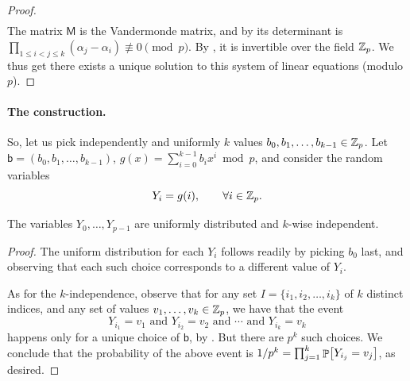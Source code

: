 \begin{proof}
\begin{align*}
    \end{align*}
    The matrix $\mathsf{M}$ is the Vandermonde matrix, and by
     its determinant is $\prod_{1 \leq i < j \leq k} (\alpha_j - \alpha_i) \not\equiv 0 \pmod p$.
    By , it is invertible over the field $\mathbb{Z}_p$.
    We thus get there exists a unique solution to this system of linear equations
    (modulo $p$).
\end{proof}





\paragraph*{The construction.}

So, let us pick independently and uniformly $k$ values
$b_0, b_1, \ldots, b_{k-1} \in \mathbb{Z}_p$. Let
$\mathsf{b} = (b_0, b_1,\ldots, b_{k-1})$,
$g(x) = \sum_{i=0}^{k-1} b_i x^i \bmod p$, and consider the random
variables
\begin{equation*}
    Y_i = g(i), \qquad\forall i \in \mathbb{Z}_p.
\end{equation*}

\begin{lemma}
    The variables $Y_0, \ldots,Y_{p-1}$ are uniformly distributed and
    $k$-wise independent.
\end{lemma}
\begin{proof}
    The uniform distribution for each $Y_i$ follows readily by picking
    $b_0$ last, and observing that each such choice corresponds to a
    different value of $Y_i$.
    
    As for the $k$-independence, observe that for any set
    $I = \{i_1, i_2, \ldots, i_k\}$ of $k$ distinct indices, and
    any set of values $v_1, \ldots, v_k \in \mathbb{Z}_p$, we have that the event
    \begin{equation*}
        Y_{i_1} = v_1 \text{ and }
        Y_{i_2} = v_2 \text{ and } \cdots \text{ and }
        Y_{i_k} = v_k%
    \end{equation*}
    happens only for a unique choice of $\mathsf{b}$, by
    . But there are $p^k$ such choices. We
    conclude that the probability of the above event is
    $1/p^k = \prod_{j=1}^k \Prob{Y_{i_j} = v_j}$, as desired.
\end{proof}

